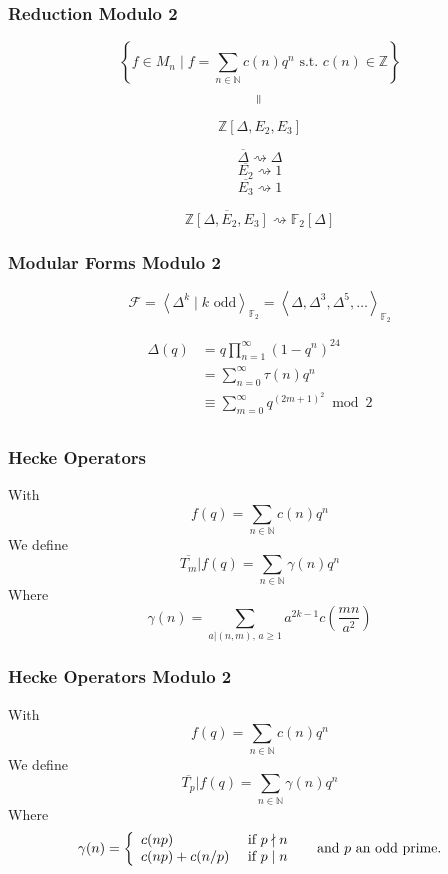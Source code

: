 \documentclass[12pt]{beamer}
\begin{document}
	\begin{frame}
		\frametitle{Reduction Modulo 2}
		$$\left\lbrace f \in M_n \mid f = \sum_{n \in \mathbb{N}} c(n)q^n \text{ s.t. } c(n) \in \mathbb{Z} \right\rbrace$$
		$$\rotatebox{90}{$=$}$$
		$$\mathbb{Z}\left[ \Delta, E_2, E_3 \right]$$
		
		$$\overline{\Delta} \rightsquigarrow \varDelta$$
		$$\overline{E_2} \rightsquigarrow 1$$
		$$\overline{E_3} \rightsquigarrow 1$$
		
		$$\overline{\mathbb{Z}\left[ \Delta, E_2, E_3 \right]} \rightsquigarrow \mathbb{F}_2 \left[ \varDelta \right]$$
	\end{frame}

	\begin{frame}
		\frametitle{Modular Forms Modulo 2}
		$$
		\mathcal{F}
		= \left\langle \Delta^k \mid k \text{ odd} \right\rangle_{\mathbb{F}_2}
		= \left\langle \Delta, \Delta^3, \Delta^5, \dots \right\rangle_{\mathbb{F}_2}
		$$
		
		\begin{align*}
			\Delta(q)
			&= q \prod_{n=1}^{\infty} (1-q^n)^{24}\\
			&= \sum_{n=0}^{\infty} \tau(n)q^n\\
			&\equiv \sum_{m=0}^{\infty} q^{(2m+1)^2} \bmod 2\\
		\end{align*}
	\end{frame}
	
	\begin{frame}
		\frametitle{Hecke Operators}
		With
		$$
		f(q) = \sum_{n \in \mathbb{N}} c(n)q^n
		$$
		We define
		$$
		\overline{T_m}|f(q) = \sum_{n \in \mathbb{N}} \gamma(n)q^n
		$$
		Where
		$$
		\gamma(n) = \sum_{a | (n,m),\, a \geq 1} a^{2k-1} c\left( \frac{mn}{a^2} \right)
		$$
	\end{frame}

	\begin{frame}
		\frametitle{Hecke Operators Modulo 2}
		With
		$$
		f(q) = \sum_{n \in \mathbb{N}} c(n)q^n
		$$
		We define
		$$
		\overline{T_p}|f(q) = \sum_{n \in \mathbb{N}} \gamma(n)q^n
		$$
		Where
		$$
		\gamma(n) = 
		\left\lbrace
		\begin{array}{l l}
		c(np)        & \text{ if } p \nmid n \\
		c(np)+c(n/p) & \text{ if } p \mid  n
		\end{array}
		\right. 
		\quad \text{ and } p \text{ an odd prime}.
		$$
	\end{frame}
\end{document}

